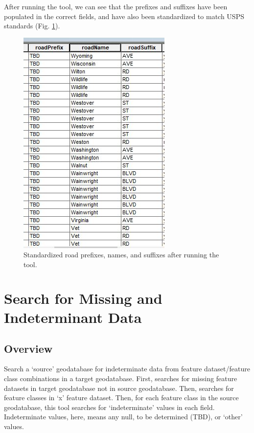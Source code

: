 \documentclass[openany]{book}
\theoremstyle{definition}
\theoremstyle{definition}
\theoremstyle{definition}
\theoremstyle{remark}
\begin{document}
After running the tool, we can see that the prefixes and suffixes have
been populated in the correct fields, and have also been standardized to
match USPS standards (Fig. \ref{fig:std3after}).

\begin{figure}[H]

{\centering \includegraphics{figures/std3-after} 

}

\caption{Standardized road prefixes, names, and suffixes after running the tool.}\label{fig:std3after}
\end{figure}

\hypertarget{indtSearch}{\chapter{Search for Missing and Indeterminant
Data}\label{indtSearch}}

\section{Overview}\label{overview-8}

Search a `source' geodatabase for indeterminate data from feature
dataset/feature class combinations in a target geodatabase. First,
searches for missing feature datasets in target geodatabase not in
source geodatabase. Then, searches for feature classes in `x' feature
dataset. Then, for each feature class in the source geodatabase, this
tool searches for `indeterminate' values in each field. Indeterminate
values, here, means any null, to be determined (TBD), or `other' values.
\end{document}
